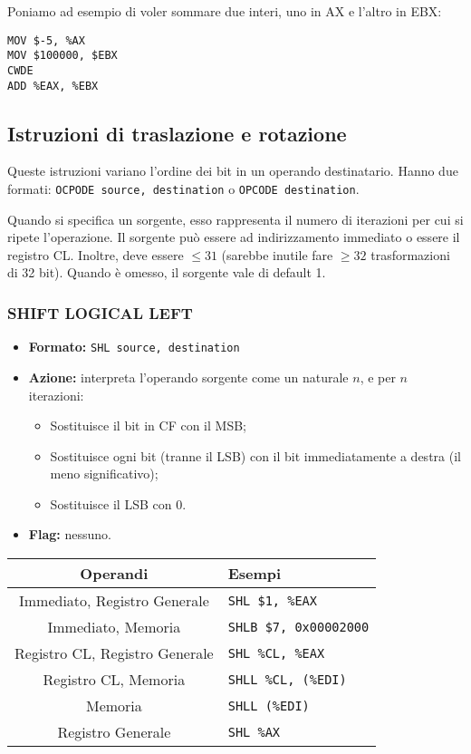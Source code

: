 \documentclass[a4paper,11pt]{article}
\begin{document}
Poniamo ad esempio di voler sommare due interi, uno in AX e l'altro in EBX:
\begin{lstlisting}[style=codestyle]	
MOV $-5, %AX
MOV $100000, $EBX
CWDE
ADD %EAX, %EBX
\end{lstlisting}

\subsection{Istruzioni di traslazione e rotazione}
Queste istruzioni variano l'ordine dei bit in un operando destinatario.
Hanno due formati: \texttt{OCPODE source, destination} o \texttt{OPCODE destination}.

Quando si specifica un sorgente, esso rappresenta il numero di iterazioni per cui si ripete l'operazione.
Il sorgente può essere ad indirizzamento immediato o essere il registro CL.
Inoltre, deve essere $\leq 31$ (sarebbe inutile fare $\geq32$ trasformazioni di 32 bit).
Quando è omesso, il sorgente vale di default 1.

\subsubsection{SHIFT LOGICAL LEFT}
\begin{itemize}
	\item \textbf{Formato:} \texttt{SHL source, destination}
	\item \textbf{Azione:} interpreta l'operando sorgente come un naturale $n$, e per $n$ iterazioni:
		\begin{itemize}
			\item Sostituisce il bit in CF con il MSB;
			\item Sostituisce ogni bit (tranne il LSB) con il bit immediatamente a destra  (il meno significativo);
			\item Sostituisce il LSB con 0.
		\end{itemize}
	\item \textbf{Flag:} nessuno.
\end{itemize}

		\begin{table}[H]
		\center {}
			\begin{tabular} { c | p{5cm} }
				\bfseries Operandi & \bfseries Esempi \\
				\hline
				Immediato, Registro Generale & \texttt{SHL \$1, \%EAX} \\
				Immediato, Memoria & \texttt{SHLB \$7, 0x00002000} \\
				Registro CL, Registro Generale & \texttt{SHL \%CL, \%EAX} \\
				Registro CL, Memoria & \texttt{SHLL \%CL, (\%EDI)} \\
				Memoria & \texttt{SHLL (\%EDI)} \\ 
				Registro Generale & \texttt{SHL \%AX}
			\end{tabular}
		\end{table}
\end{document}
